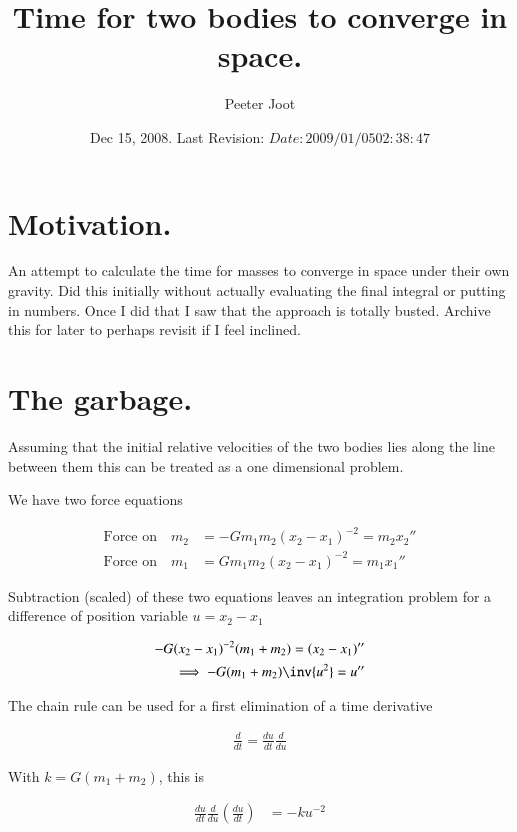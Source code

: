 \documentclass{article}
\title{ Time for two bodies to converge in space. }
\author{Peeter Joot}
\date{ Dec 15, 2008.  Last Revision: $Date: 2009/01/05 02:38:47 $ }
\begin{document}
\maketitle{}


\section{ Motivation.}

An attempt to calculate the time for masses to converge in space under their own gravity.  Did this initially without actually evaluating the final
integral or putting in numbers.  Once I did that I saw that the approach is totally busted.  Archive this for later to perhaps revisit if I feel
inclined.

\section{ The garbage. }

Assuming that the initial relative velocities of the two bodies lies along
the line between them this can be treated as a one dimensional problem.

We have two force equations

\begin{align*}
\text{Force on} \quad m_2 &= - G m_1 m_2 (x_2 - x_1)^{-2} = m_2 {x_2}'' \\
\text{Force on} \quad m_1 &=  G m_1 m_2 (x_2 - x_1)^{-2} = m_1 {x_1}''
\end{align*}

Subtraction (scaled) of these two equations leaves an integration problem for a difference of position variable $u = x_2 - x_1$

\begin{align*}
- G (x_2 - x_1)^{-2} (m_1 + m_2)= (x_2 - x_1)'' \\
\implies
- G (m_1 + m_2) \inv{u^2} = u'' \\
\end{align*}

The chain rule can be used for a first elimination of a time derivative

\begin{align*}
\frac{d}{dt} = \frac{du}{dt} \frac{d}{du}
\end{align*}

With $k = G(m_1 + m_2)$, this is

\begin{align*}
\frac{du}{dt} \frac{d}{du} \left(\frac{du}{dt}\right) &= -k u^{-2}
\end{align*}
\end{document}
